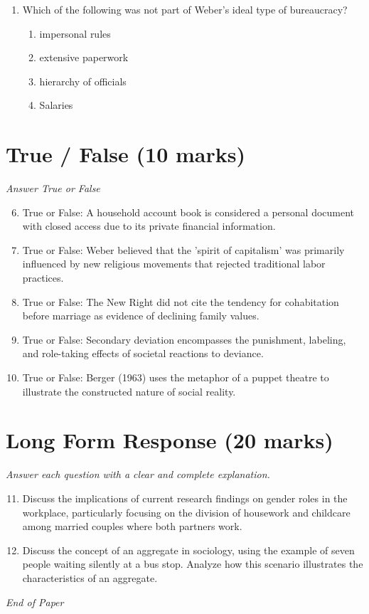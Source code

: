 \documentclass[12pt]{article}
\begin{document}
\begin{enumerate}[label=\arabic*.]
\begin{enumerate}[label=(\alph*)]
    \item transnational corporations
    \item multi-media empires
    \item ownership concentrated within one medium
    \item government-owned companies
\end{enumerate}
\item Which of the following was not part of Weber's ideal type of bureaucracy?
\begin{enumerate}[label=(\alph*)]
    \item impersonal rules
    \item extensive paperwork
    \item hierarchy of officials
    \item Salaries
\end{enumerate}
\end{enumerate}

\section*{True / False (10 marks)}
\textit{Answer True or False}
\begin{enumerate}[label=\arabic*.]
\setcounter{enumi}{5}
\item True or False: A household account book is considered a personal document with closed access due to its private financial information.
\item True or False: Weber believed that the 'spirit of capitalism' was primarily influenced by new religious movements that rejected traditional labor practices.
\item True or False: The New Right did not cite the tendency for cohabitation before marriage as evidence of declining family values.
\item True or False: Secondary deviation encompasses the punishment, labeling, and role-taking effects of societal reactions to deviance.
\item True or False: Berger (1963) uses the metaphor of a puppet theatre to illustrate the constructed nature of social reality.
\end{enumerate}

\section*{Long Form Response (20 marks)}
\textit{Answer each question with a clear and complete explanation.}
\begin{enumerate}[label=\arabic*.]
\setcounter{enumi}{10}
\item Discuss the implications of current research findings on gender roles in the workplace, particularly focusing on the division of housework and childcare among married couples where both partners work.
\item Discuss the concept of an aggregate in sociology, using the example of seven people waiting silently at a bus stop. Analyze how this scenario illustrates the characteristics of an aggregate.
\end{enumerate}

\vfill
\noindent\textit{End of Paper}
\end{document}
